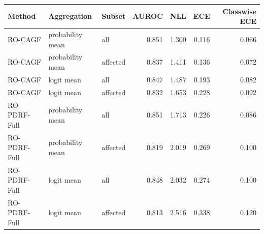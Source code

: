 \begin{tabular}{lllrrrr}
\toprule
Method & Aggregation & Subset & AUROC & NLL & ECE & Classwise ECE \\
\midrule
RO-CAGF & probability mean & all & 0.851 & 1.300 & 0.116 & 0.066 \\
RO-CAGF & probability mean & affected & 0.837 & 1.411 & 0.136 & 0.072 \\
RO-CAGF & logit mean & all & 0.847 & 1.487 & 0.193 & 0.082 \\
RO-CAGF & logit mean & affected & 0.832 & 1.653 & 0.228 & 0.092 \\
RO-PDRF-Full & probability mean & all & 0.851 & 1.713 & 0.226 & 0.086 \\
RO-PDRF-Full & probability mean & affected & 0.819 & 2.019 & 0.269 & 0.100 \\
RO-PDRF-Full & logit mean & all & 0.848 & 2.032 & 0.274 & 0.100 \\
RO-PDRF-Full & logit mean & affected & 0.813 & 2.516 & 0.338 & 0.120 \\
\bottomrule
\end{tabular}